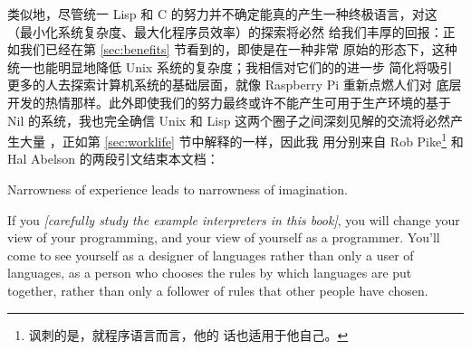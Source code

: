 类似地，尽管统一 Lisp 和 C 的努力并不确定能真的产生一种终极语言，对这%
（最小化系统复杂度、最大化程序员效率）的探索将必然
给我们丰厚的回报：正如我们已经在第 \ref{sec:benefits} 节看到的，即使是在一种非常
原始的形态下，这种统一也能明显地降低 Unix 系统的复杂度；我相信对它们的的进一步
简化将吸引更多的人去探索计算机系统的基础层面，就像 Raspberry Pi 重新点燃人们对
底层开发的热情那样。此外即使我们的努力最终或许不能产生可用于生产环境的基于 Nil
的系统，我也完全确信 Unix 和 Lisp 这两个圈子之间深刻见解的交流将必然产生大量%
，正如第 \ref{sec:worklife} 节中解释的一样，因此我
用分别来自 Rob Pike\footnote{讽刺的是，就程序语言而言，他的
话也适用于他自己。} 和 Hal Abelson 的两段引文结束本文档：
\pagebreak
\begin{quoting}
	Narrowness of experience leads to narrowness of imagination.
\end{quoting}
\colskipc
\begin{quoting}
	If you \emph{[carefully study the example interpreters in this book]},
	you will change your view of your programming, and your view of
	yourself as a programmer.  You'll come to see yourself as a designer
	of languages rather than only a user of languages, as a person
	who chooses the rules by which languages are put together, rather
	than only a follower of rules that other people have chosen.
\end{quoting}

